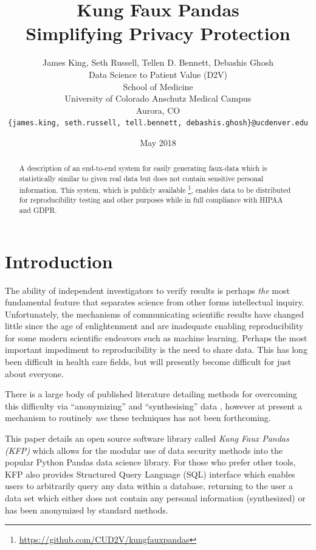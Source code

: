 \documentclass{article}
\title{%
  Kung Faux Pandas \\
  \large Simplifying Privacy Protection
  }
\author{
  James King, Seth Russell, Tellen D. Bennett, Debashis Ghosh\\
  Data Science to Patient Value (D2V)\\
  School of Medicine\\
  University of Colorado Anschutz Medical Campus\\
  Aurora, CO\\
  \texttt{\{james.king, seth.russell, tell.bennett, debashis.ghosh\}@ucdenver.edu}
  }
\date{May 2018}
\begin{document}

\maketitle

\begin{abstract}
A description of an end-to-end system for easily generating faux-data which is statistically similar to given real data but does not contain sensitive personal information.  This system, which is publicly available \footnote{\url{https://github.com/CUD2V/kungfauxpandas}}, enables data to be distributed for reproducibility testing and other purposes while in full compliance with HIPAA and GDPR.
\end{abstract}


\section{Introduction}

The ability of independent investigators to verify results is perhaps \emph{the} most fundamental feature that separates science from other forms intellectual inquiry.  Unfortunately, the mechanisms of communicating scientific results have changed little since the age of enlightenment and are inadequate enabling reproducibility for some modern scientific endeavors such as machine learning.  Perhaps the most important impediment to reproducibility is the need to share data.  This has long been difficult in health care fields, but will presently become difficult for just about everyone.

There is a large body of published literature detailing methods for overcoming this difficulty via ``anonymizing'' and ``synthesising'' data \cite{patki_synthetic_2016, choi_generating_2017}, however at present a mechanism to routinely \emph{use} these techniques has not been forthcoming.

This paper details an open source software library called \emph{Kung Faux Pandas (KFP)} which allows for the modular use of data security methods into the popular Python Pandas data science library. For those who prefer other tools, KFP also provides Structured Query Language (SQL) interface which enables users to arbitrarily query any data within a database, returning to the user a data set which either does not contain any personal information (synthesized) or has been anonymized by standard methods.
\end{document}

